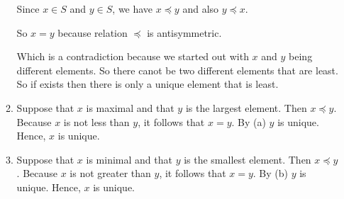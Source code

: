 \documentclass{sig-alternate-05-2015}
\begin{document}
\begin{enumerate}
\begin{enumerate}
		Since $x \in S$ and $y\in S$, we have $x\preceq y$ and also $y \preceq x$. 
		
		So $x=y$ because relation $\preceq$ is antisymmetric.
		
		Which is a contradiction because we started out with $x$ and $y$ being different
		elements. So there canot be two different elements that are least. So if
		exists then there is only a unique element that is least.
		
		\item Suppose that $x$ is maximal and that $y$ is the largest
		element. Then $x \preceq y$. Because $x$ is not less than $y$, it follows
		that $x = y$. By (a) $y$ is unique. Hence, $x$ is
		unique.
		\item Suppose that $x$ is minimal and that $y$ is the smallest
		element. Then $x \preceq y$. Because $x$ is not greater than $y$, it follows
		 that $x = y$. By (b) $y$ is unique. Hence, $x$ is unique.
	\end{enumerate}
\end{enumerate}
\end{document}
